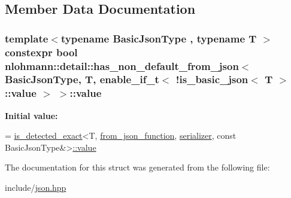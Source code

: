 \subsection{Member Data Documentation}
\subsubsection[{\texorpdfstring{value}{value}}]{\setlength{\rightskip}{0pt plus 5cm}template$<$typename Basic\+Json\+Type , typename T $>$ constexpr bool {\bf nlohmann\+::detail\+::has\+\_\+non\+\_\+default\+\_\+from\+\_\+json}$<$ Basic\+Json\+Type, T, {\bf enable\+\_\+if\+\_\+t}$<$ !{\bf is\+\_\+basic\+\_\+json}$<$ T $>$\+::value $>$ $>$\+::value\hspace{0.3cm}{\ttfamily [static]}}\hypertarget{structnlohmann_1_1detail_1_1has__non__default__from__json_3_01BasicJsonType_00_01T_00_01enable__b7a8cd863889b54d1139b207b4233111_a5d5bc2b9f1c107696d64d92cf6b5d0d7}{}\label{structnlohmann_1_1detail_1_1has__non__default__from__json_3_01BasicJsonType_00_01T_00_01enable__b7a8cd863889b54d1139b207b4233111_a5d5bc2b9f1c107696d64d92cf6b5d0d7}
{\bfseries Initial value\+:}
\begin{DoxyCode}
=
        \hyperlink{namespacenlohmann_1_1detail_aa5a24092e12003ae73ae457b0dd29abd}{is\_detected\_exact}<T, \hyperlink{namespacenlohmann_1_1detail_a1711ee5cef66a0523055c8d9f024f322}{from\_json\_function}, 
      \hyperlink{structnlohmann_1_1detail_1_1has__non__default__from__json_3_01BasicJsonType_00_01T_00_01enable__b7a8cd863889b54d1139b207b4233111_a4bcee5e52902d3011df08cf0233e5e10}{serializer},
        \textcolor{keyword}{const} BasicJsonType&>\hyperlink{structnlohmann_1_1detail_1_1has__non__default__from__json_3_01BasicJsonType_00_01T_00_01enable__b7a8cd863889b54d1139b207b4233111_a5d5bc2b9f1c107696d64d92cf6b5d0d7}{::value}
\end{DoxyCode}


The documentation for this struct was generated from the following file\+:\begin{DoxyCompactItemize}
\item 
include/\hyperlink{json_8hpp}{json.\+hpp}\end{DoxyCompactItemize}
